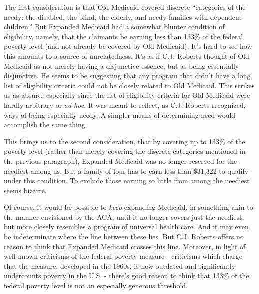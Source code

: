 \documentclass[
  11pt,
  letterpaper,
  DIV=11,
  numbers=noendperiod,
  oneside]{scrartcl}
\begin{document}
The first consideration is that Old Medicaid covered discrete
``categories of the needy: the disabled, the blind, the elderly, and
needy families with dependent children.'' But Expanded Medicaid had a somewhat blunter
condition of eligibility, namely, that the claimants be earning less
than 133\% of the federal poverty level (and not already be covered by
Old Medicaid). It's hard to see how this amounts to a source of
unrelatedness. It's as if C.J. Roberts thought of Old Medicaid as not
merely having a disjunctive essence, but as being essentially
disjunctive. He seems to be suggesting that any program that didn't have
a long list of eligibility criteria could not be closely related to Old
Medicaid. This strikes us as absurd, especially since the list of
eligibility criteria for Old Medicaid were hardly arbitrary or \emph{ad
hoc}. It was meant to reflect, as C.J. Roberts recognized, ways of being
especially needy. A simpler means of determining need would accomplish
the same thing.

This brings us to the second consideration, that by covering up to 133\%
of the poverty level (rather than merely covering the discrete
categories mentioned in the previous paragraph), Expanded Medicaid was
no longer reserved for the neediest among us. But a family of four has
to earn less than \$31,322 to qualify under this condition. To
exclude those earning so little from among the neediest seems
bizarre.

Of course, it would be possible to \emph{keep} expanding Medicaid, in
something akin to the manner envisioned by the ACA, until it no longer
covers just the neediest, but more closely resembles a program of
universal health care. And it may even be indeterminate where the line
between these lies. But C.J. Roberts offers no reason to think that
Expanded Medicaid crosses this line. Moreover, in light of well-known
criticisms of the federal poverty measure - criticisms which charge that
the measure, developed in the 1960s, is now outdated and significantly
undercounts poverty in the U.S. - there's good reason to think that
133\% of the federal poverty level is not an especially generous
threshold.
\end{document}
